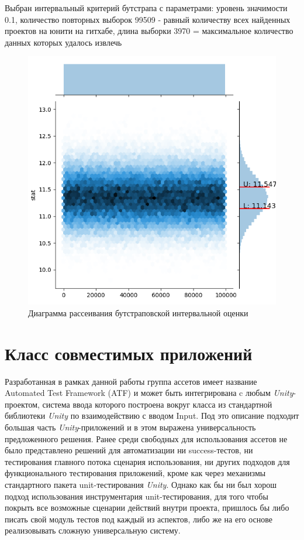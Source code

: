 Выбран интервальный критерий бутстрапа с параметрами: уровень значимости 0.1, количество повторных выборок 99509 - равный количеству всех найденных проектов на юнити на гитхабе, длина выборки 3970 = максимальное количество данных которых удалось извлечь

\begin{figure}[H]
	\centering
	\includegraphics[width=\linewidth]{experiment.png}
	\caption{Диаграмма рассеивания бутстраповской интервальной оценки}
	\label{experiment}
\end{figure}

\section{Класс совместимых приложений}
Разработанная в рамках данной работы группа ассетов имеет название Automated Test Framework (ATF) и может быть интегрирована c любым  \textit{Unity}-проектом, система ввода которого построена вокруг класса из стандартной библиотеки \textit{Unity} по взаимодействию с вводом Input. Под это описание подходит большая часть \textit{Unity}-приложений и в этом выражена универсальность предложенного решения. Ранее среди свободных для использования ассетов не было представлено решений для автоматизации ни success-тестов, ни тестирования главного потока сценария использования, ни других подходов для функционального тестирования приложений, кроме как через механизмы стандартного пакета unit-тестирования \textit{Unity}. Однако как бы ни был хорош подход использования инструментария unit-тестирования, для того чтобы покрыть все возможные сценарии действий внутри проекта, пришлось бы либо писать свой модуль тестов под каждый из аспектов, либо же на его основе реализовывать сложную универсальную систему.

